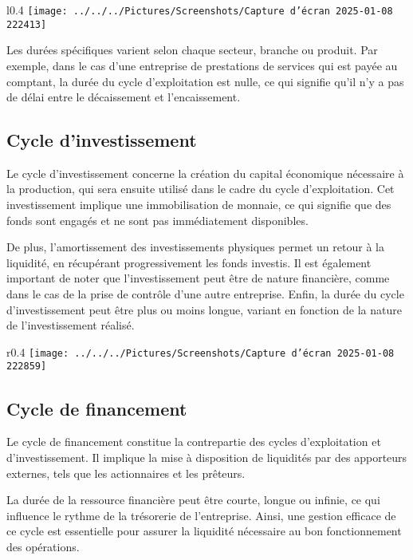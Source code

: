 \documentclass[a4paper, 12pt]{report}
\begin{document}
\begin{wrapfigure}{l}{0.4\textwidth}
	\centering
\texttt{[image: ../../../Pictures/Screenshots/Capture d'écran 2025-01-08 222413]}
\end{wrapfigure}	
	
Les durées spécifiques varient selon chaque secteur, branche ou produit. Par exemple, dans le cas d'une entreprise de prestations de services qui est payée au comptant, la durée du cycle d'exploitation est nulle, ce qui signifie qu'il n'y a pas de délai entre le décaissement et l'encaissement.

\subsection{Cycle d'investissement}

Le cycle d'investissement concerne la création du capital économique nécessaire à la production, qui sera ensuite utilisé dans le cadre du cycle d'exploitation. Cet investissement implique une immobilisation de monnaie, ce qui signifie que des fonds sont engagés et ne sont pas immédiatement disponibles. 

De plus, l'amortissement des investissements physiques permet un retour à la liquidité, en récupérant progressivement les fonds investis. Il est également important de noter que l'investissement peut être de nature financière, comme dans le cas de la prise de contrôle d'une autre entreprise. Enfin, la durée du cycle d'investissement peut être plus ou moins longue, variant en fonction de la nature de l'investissement réalisé.

\begin{wrapfigure}{r}{0.4\textwidth}
	\centering
\texttt{[image: ../../../Pictures/Screenshots/Capture d'écran 2025-01-08 222859]}
\end{wrapfigure}

\subsection{Cycle de financement}

Le cycle de financement constitue la contrepartie des cycles d'exploitation et d'investissement. Il implique la mise à disposition de liquidités par des apporteurs externes, tels que les actionnaires et les prêteurs. 
		
La durée de la ressource financière peut être courte, longue ou infinie, ce qui influence le rythme de la trésorerie de l'entreprise. Ainsi, une gestion efficace de ce cycle est essentielle pour assurer la liquidité nécessaire au bon fonctionnement des opérations.
\end{document}
